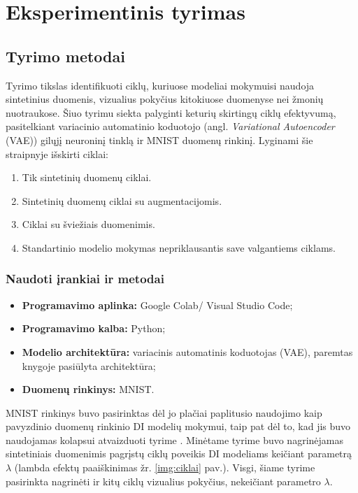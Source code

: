 \documentclass{VUMIFInfKursinis}
\begin{document}
\section{Eksperimentinis tyrimas}
\subsection{Tyrimo metodai}
Tyrimo tikslas identifikuoti ciklų, kuriuose modeliai mokymuisi naudoja sintetinius duomenis, vizualius pokyčius kitokiuose duomenyse nei žmonių nuotraukose. Šiuo tyrimu siekta palyginti keturių skirtingų ciklų efektyvumą, pasitelkiant variacinio automatinio koduotojo (angl. \textsl{Variational Autoencoder} (VAE)) gilųjį neuroninį tinklą ir MNIST \cite{MNIST} duomenų rinkinį. Lyginami šie straipnyje \cite{ModelsGoMAD} išskirti ciklai:
\begin{enumerate}
    \item Tik sintetinių duomenų ciklai.
    \item Sintetinių duomenų ciklai su augmentacijomis.
    \item Ciklai su šviežiais duomenimis.
    \item Standartinio modelio mokymas nepriklausantis save valgantiems ciklams.
\end{enumerate}

\subsubsection{Naudoti įrankiai ir metodai}

\begin{itemize}
    \item \textbf{Programavimo aplinka:} Google Colab/ Visual Studio Code;
    \item \textbf{Programavimo kalba:} Python;
    \item \textbf{Modelio architektūra:} variacinis automatinis koduotojas (VAE), paremtas \cite{DeepLearningPython} knygoje pasiūlyta architektūra;
    \item \textbf{Duomenų rinkinys:} MNIST.
\end{itemize}


MNIST rinkinys buvo pasirinktas dėl jo plačiai paplitusio naudojimo kaip pavyzdinio duomenų rinkinio DI modelių mokymui, taip pat dėl to, kad jis buvo naudojamas kolapsui atvaizduoti tyrime \cite{ModelsGoMAD}. Minėtame tyrime buvo nagrinėjamas sintetiniais duomenimis pagrįstų ciklų poveikis DI modeliams keičiant parametrą \(\lambda\) (lambda efektų paaiškinimas žr. \ref{img:ciklai} pav.). Visgi, šiame tyrime pasirinkta nagrinėti ir kitų ciklų vizualius pokyčius, nekeičiant parametro \(\lambda\). 
\end{document}
